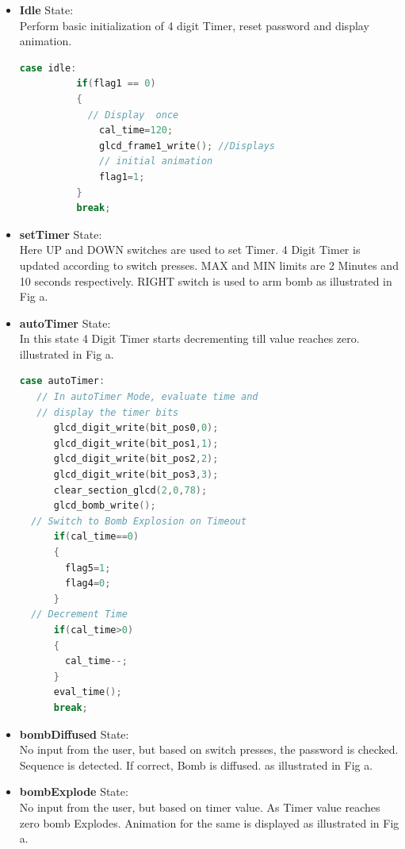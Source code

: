 \documentclass[a4paper,12pt,oneside]{book}
\begin{document}
\begin{itemize}
  \item \textbf{{\small Idle}} State: \\ \qquad \qquad Perform basic initialization of 4 digit Timer, reset password and display animation.
    \begin{lstlisting}[basicstyle = \small, language = C]
        case idle:
          if(flag1 == 0)
          {
            // Display  once
              cal_time=120;
              glcd_frame1_write(); //Displays 
              // initial animation
              flag1=1;
          }
          break;
  \end{lstlisting}
  \item \textbf{{\small setTimer}} State: \\ \qquad \qquad Here UP and DOWN switches are used to set Timer. 4 Digit Timer is updated according to switch presses. MAX and MIN limits are 2 Minutes and 10 seconds respectively. RIGHT switch is used to arm bomb as illustrated in Fig a.
  \item \textbf{{\small autoTimer}} State: \\ \qquad \qquad In this state 4 Digit Timer starts decrementing till value reaches zero.  illustrated in Fig a.
      \begin{lstlisting}[basicstyle = \small, language = C]
  case autoTimer:
   // In autoTimer Mode, evaluate time and 
   // display the timer bits
      glcd_digit_write(bit_pos0,0);
      glcd_digit_write(bit_pos1,1);
      glcd_digit_write(bit_pos2,2);
      glcd_digit_write(bit_pos3,3);
      clear_section_glcd(2,0,78);
      glcd_bomb_write();
  // Switch to Bomb Explosion on Timeout
      if(cal_time==0)
      {
        flag5=1;
        flag4=0;
      }
  // Decrement Time
      if(cal_time>0)
      {
        cal_time--;
      }
      eval_time();
      break;
  \end{lstlisting}
  \item \textbf{{\small bombDiffused}} State: \\ \qquad \qquad No input from the user, but based on switch presses, the password is checked. Sequence is detected. If correct, Bomb is diffused. as illustrated in Fig a.
  \item \textbf{{\small bombExplode}} State: \\ \qquad \qquad No input from the user, but based on timer value. As Timer value reaches zero bomb Explodes. Animation for the same is displayed as illustrated in Fig a.
\end{itemize}
\end{document}
